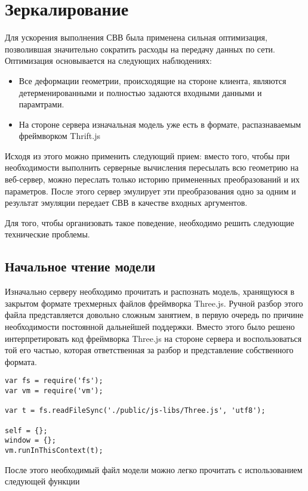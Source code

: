 \section{Зеркалирование}

Для ускорения выполнения СВВ была применена сильная оптимизация, позволившая
значительно сократить расходы на передачу данных по сети. Оптимизация
основывается на следующих наблюдениях:
\begin{itemize}
    \item Все деформации геометрии, происходящие на стороне клиента, являются
    детерменированными и полностью задаются входными данными и парамтрами.
    \item На стороне сервера изначальная модель уже есть в формате,
    распазнаваемым фреймворком Thrift.js
\end{itemize}

Исходя из этого можно применить следующий прием: вместо того, чтобы при
необходимости выполнить серверные вычисления пересылать всю геометрию на
веб-сервер, можно переслать только историю примененных преобразований и их
параметров. После этого сервер эмулирует эти преобразования одно за одним и
результат эмуляции передает СВВ в качестве входных аргументов.

Для того, чтобы организовать такое поведение, необходимо решить следующие
технические проблемы.

\subsection{Начальное чтение модели}

Изначально серверу необходимо прочитать и распознать модель, хранящуюся в
закрытом формате трехмерных файлов фреймворка Three.js. Ручной разбор этого
файла представляется довольно сложным занятием, в первую очередь по причине
необходимости постоянной дальнейшей поддержки. Вместо этого было решено
интерпретировать код фреймворка Three.js на стороне сервера и воспользоваться
той его частью, которая ответственная за разбор и представление собственного
формата.

\begin{lstlisting}
var fs = require('fs');
var vm = require('vm');

var t = fs.readFileSync('./public/js-libs/Three.js', 'utf8');

self = {};
window = {};
vm.runInThisContext(t);
\end{lstlisting}

После этого необходимый файл модели можно легко прочитать с использованием
следующей функции

